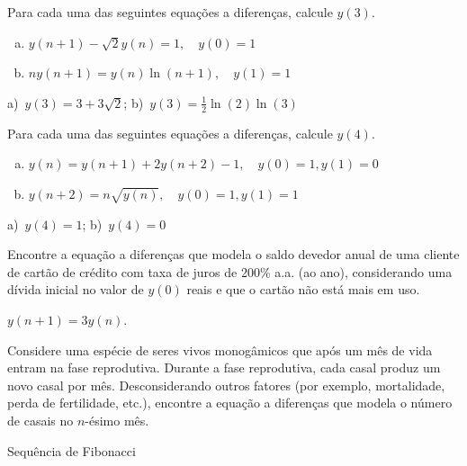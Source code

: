 \begin{exer}
  Para cada uma das seguintes equações a diferenças, calcule $y(3)$.
  \begin{enumerate}[a)]
  \item $\displaystyle y(n+1)-\sqrt{2}y(n) = 1,\quad y(0)=1$
  \item $\displaystyle ny(n+1) = y(n)\ln(n+1),\quad y(1)=1$
  \end{enumerate}
\end{exer}
\begin{resp}
  a)~$y(3)=3+3\sqrt{2}$; b)~$y(3)=\frac{1}{2}\ln(2)\ln(3)$
\end{resp}

\begin{exer}
  Para cada uma das seguintes equações a diferenças, calcule $y(4)$.
  \begin{enumerate}[a)]
  \item $\displaystyle y(n) = y(n+1) + 2y(n+2) - 1,\quad y(0)=1, y(1)=0$
  \item $\displaystyle y(n+2) = n\sqrt{y(n)},\quad y(0)=1, y(1)=1$
  \end{enumerate}
\end{exer}
\begin{resp}
  a)~$y(4)=1$; b)~$y(4)=0$
\end{resp}

\begin{exer}
  Encontre a equação a diferenças que modela o saldo devedor anual de uma cliente de cartão de crédito com taxa de juros de 200\% a.a. (ao ano), considerando uma dívida inicial no valor de $y(0)$ reais e que o cartão não está mais em uso.
\end{exer}
\begin{resp}
  $y(n+1) = 3y(n)$.
\end{resp}

\begin{exer}
  Considere uma espécie de seres vivos monogâmicos que após um mês de vida entram na fase reprodutiva. Durante a fase reprodutiva, cada casal produz um novo casal por mês. Desconsiderando outros fatores (por exemplo, mortalidade, perda de fertilidade, etc.), encontre a equação a diferenças que modela o número de casais no $n$-ésimo mês. 
\end{exer}
\begin{resp}
  Sequência de Fibonacci
\end{resp}
